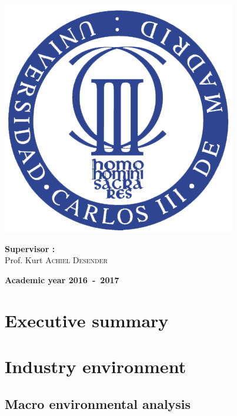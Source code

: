 \documentclass[12pt,a4paper,oneside]{book}
\begin{document}
\begin{titlepage}
\begin{center}
\includegraphics[keepaspectratio=true,width=\textwidth-2cm]{images/Seal_of_the_University_of_Carlos_III.jpg}
\vfill{}
\begin{flushleft}{\large \textbf{Supervisor  :}}\\
{\large Prof. Kurt \textsc{Achiel Desender}}
\end{flushleft}{\large\par}
\vfill{}\vfill{}\enlargethispage{2cm}
\textbf{Academic year 2016~-~2017}
\end{center}
\end{titlepage}



\newpage
\thispagestyle{empty} 
\null


\tableofcontents

\chapter{Executive summary}

\chapter{Industry environment}

\section{Macro environmental analysis}
\end{document}

